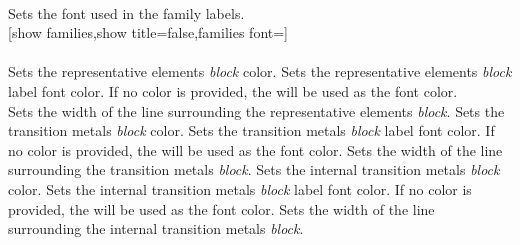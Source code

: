 \\ [0pt]\pgfPTendoption%
\label{option_families font}%
%
{Sets the font used in the family labels.}%
\\ [5pt][show families,show title=false,families font=\string\normalsize]%
\\ [5pt]\makebox[\linewidth][c]{\scalebox{.6}{\pgfPT[show families,show title=false,families font=\normalsize]}}%
\\ [0pt]\pgfPTendoption%
\label{option_r family color}%
%
{Sets the representative elements \textit{block} color.}%
\label{option_r fanily_font color}%
%
{Sets the representative elements \textit{block} label font color. If no color is provided, the  will be used as the font color.}%
\newpage\ \\ [-32pt]%
\label{option_r family line width}%
%
{Sets the width of the line surrounding the representative elements \textit{block}.}%
\label{option_tm family color}%
%
{Sets the transition metals \textit{block} color.}%
\label{option_tm fanily_font color}%
%
{Sets the transition metals \textit{block} label font color. If no color is provided, the  will be used as the font color.}%
\label{option_tm family line width}%
%
{Sets the width of the line surrounding the transition metals \textit{block}.}%
\label{option_itm family color}%
%
{Sets the internal transition metals \textit{block} color.}%
\label{option_itm family_font color}%
%
{Sets the internal transition metals \textit{block} label font color. If no color is provided, the  will be used as the font color.}%
\label{option_itm family line width}%
%
{Sets the width of the line surrounding the internal transition metals \textit{block}.}%
